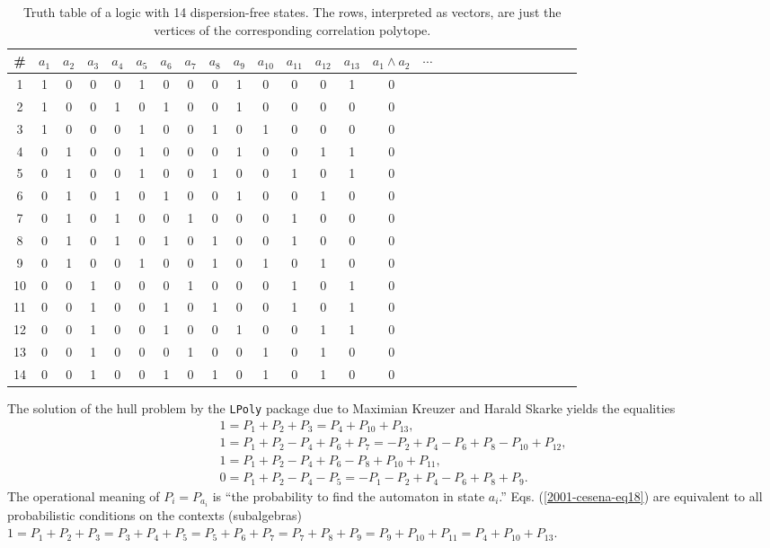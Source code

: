 \begin{table}
\begin{center}
\begin{tabular}{c|cccccccccccccccccccccccccc}
\hline\hline
\#&$a_1$&$a_2$&$a_3$&$a_4$&$a_5$&$a_6$&$a_7$&$a_8$&$a_9$&$a_{10}$&$a_{11}$&$a_{12}$&$a_{13}$&$a_{1}\wedge a_{2}$ &$\cdots$\\
\hline
1  &1&0&0&0&1&0&0&0&1&0&0&0&1&0     \\
2  &1&0&0&1&0&1&0&0&1&0&0&0&0&0     \\
3  &1&0&0&0&1&0&0&1&0&1&0&0&0&0     \\
4  &0&1&0&0&1&0&0&0&1&0&0&1&1&0     \\
5  &0&1&0&0&1&0&0&1&0&0&1&0&1&0     \\
6  &0&1&0&1&0&1&0&0&1&0&0&1&0&0     \\
7  &0&1&0&1&0&0&1&0&0&0&1&0&0&0     \\
8  &0&1&0&1&0&1&0&1&0&0&1&0&0&0     \\
9  &0&1&0&0&1&0&0&1&0&1&0&1&0&0     \\
10 &0&0&1&0&0&0&1&0&0&0&1&0&1&0     \\
11 &0&0&1&0&0&1&0&1&0&0&1&0&1&0     \\
12 &0&0&1&0&0&1&0&0&1&0&0&1&1&0     \\
13 &0&0&1&0&0&0&1&0&0&1&0&1&0&0     \\
14 &0&0&1&0&0&1&0&1&0&1&0&1&0&0     \\
\hline\hline
\end{tabular}
\end{center}
\caption{
Truth table of a logic with 14 dispersion-free states.
The rows, interpreted as vectors, are just the vertices of the corresponding correlation polytope.
\label{2001-cesena-t2}}
\end{table}
The solution of the hull problem by
the {\tt LPoly} package due to Maximian Kreuzer
and Harald Skarke \cite{kreuzer-skarke} yields the equalities
\begin{equation}
\label{2001-cesena-eq18}
\begin{array}{l}
1 =   P_1  +P_2  +P_3 =   P_4 +P_{10} +P_{13}                          ,\\
1 = P_1+P_2 -P_4  +P_6+P_7 =  -P_2+P_4 -P_6+P_8 -P_{10}+P_{12}                  ,\\
1 =   P_1  +P_2 -P_4+P_6-P_8+P_{10}  +P_{11} ,\\
0 = P_1  +P_2-P_4 -P_5  = -P_1-P_2  +P_4 -P_6  +P_8  +P_9.
\end{array}
\end{equation}
The operational meaning of $P_i=P_{a_i}$  is
``the probability to find the automaton in state $a_i$.''
Eqs. (\ref{2001-cesena-eq18}) are equivalent to all probabilistic conditions on the contexts
(subalgebras)
$1
=P_1+P_2+P_3
=P_3+P_4+P_5
=P_5+P_6+P_7
=P_7+P_8+P_9
=P_9+P_{10}+P_{11}
=P_4+P_{10}+P_{13}
$.


